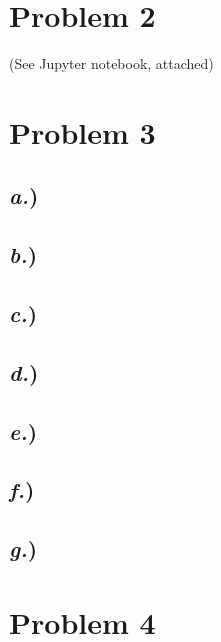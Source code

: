 \documentclass{article}
\begin{document}

\section*{Problem 2}

(See Jupyter notebook, attached)




\section*{Problem 3}
\subsection*{\textit{a.})}
\subsection*{\textit{b.})}
\subsection*{\textit{c.})}
\subsection*{\textit{d.})}
\subsection*{\textit{e.})}
\subsection*{\textit{f.})}
\subsection*{\textit{g.})}




\section*{Problem 4}






\end{document}

